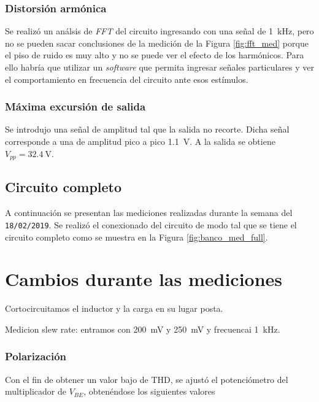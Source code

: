 		\subsubsection{Distorsión armónica}
		
			Se realizó un análsis de \emph{FFT} del circuito ingresando con una señal de \SI{1}{\kHz}, pero no se pueden sacar conclusiones de la medición de la Figura \ref{fig:fft_med} porque el piso de ruido es muy alto y no se puede ver el efecto de los harmónicos. Para ello habría que utilizar un \emph{software} que permita ingresar señales particulares y ver el comportamiento en frecuencia del circuito ante esos estímulos.


		\subsubsection{Máxima excursión de salida}
			
		Se introdujo una señal de amplitud tal que la salida no recorte. Dicha señal corresponde a una de amplitud pico a pico \SI{1.1}{\V}. A la salida se obtiene $V_{pp} = \SI{32.4}{\V}$.


		\subsection{Circuito completo}
		A continuación se presentan las mediciones realizadas durante la semana del \texttt{18/02/2019}. Se realizó el conexionado del circuito de modo tal que se tiene el circuito completo como se muestra en la Figura \ref{fig:banco_med_full}. 

		\section{Cambios durante las mediciones}
			Cortocircuitamos el inductor y la carga en su lugar posta.

			Medicion slew rate: entramos con \SI{200}{\mV} y \SI{250}{\mV} y frecuencai \SI{1}{\kHz}.

		\subsubsection{Polarización}
			Con el fin de obtener un valor bajo de THD, se ajustó el potenciómetro del multiplicador de $V_{BE}$, obtenéndose los siguientes valores

